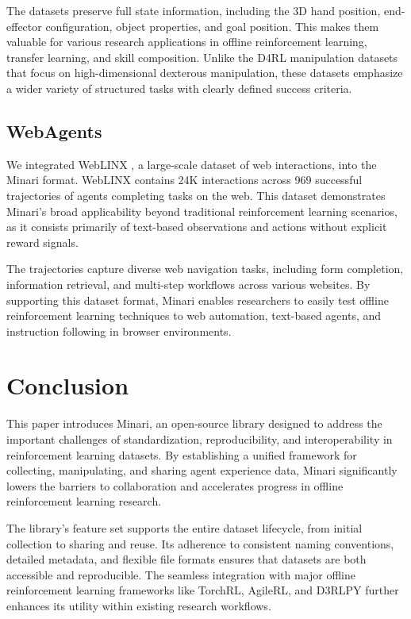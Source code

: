 \documentclass{article}
\begin{document}
The datasets preserve full state information, including the 3D hand position, end-effector configuration, object properties, and goal position. This makes them valuable for various research applications in offline reinforcement learning, transfer learning, and skill composition. Unlike the D4RL manipulation datasets that focus on high-dimensional dexterous manipulation, these datasets emphasize a wider variety of structured tasks with clearly defined success criteria.


\subsection{WebAgents}
We integrated WebLINX \cite{weblinx}, a large-scale dataset of web interactions, into the Minari format. WebLINX contains 24K interactions across 969 successful trajectories of agents completing tasks on the web. This dataset demonstrates Minari's broad applicability beyond traditional reinforcement learning scenarios, as it consists primarily of text-based observations and actions without explicit reward signals.

The trajectories capture diverse web navigation tasks, including form completion, information retrieval, and multi-step workflows across various websites. By supporting this dataset format, Minari enables researchers to easily test offline reinforcement learning techniques to web automation, text-based agents, and instruction following in browser environments.

\section{Conclusion}
This paper introduces Minari, an open-source library designed to address the important challenges of standardization, reproducibility, and interoperability in reinforcement learning datasets. By establishing a unified framework for collecting, manipulating, and sharing agent experience data, Minari significantly lowers the barriers to collaboration and accelerates progress in offline reinforcement learning research.

The library's feature set supports the entire dataset lifecycle, from initial collection to sharing and reuse. Its adherence to consistent naming conventions, detailed metadata, and flexible file formats ensures that datasets are both accessible and reproducible. The seamless integration with major offline reinforcement learning frameworks like TorchRL, AgileRL, and D3RLPY further enhances its utility within existing research workflows.
\end{document}
